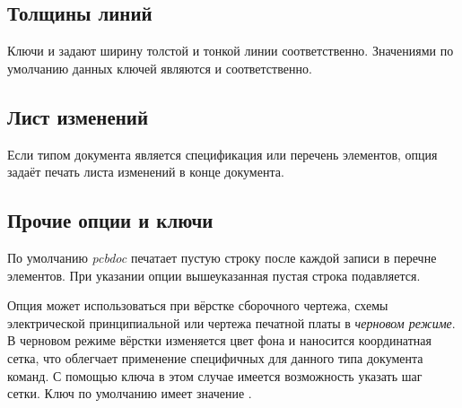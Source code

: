 \subsection{Толщины линий}

Ключи  и  задают ширину толстой и
тонкой линии соответственно. Значениями по умолчанию данных ключей являются
\bfsf{0.6mm} и \bfsf{0.3mm} соответственно.

\subsection{Лист изменений}

Если типом документа является спецификация или перечень элементов, опция
 задаёт печать листа изменений в конце документа.

\subsection{Прочие опции и ключи}

По умолчанию \emph{pcbdoc} печатает пустую строку после каждой записи в перечне
элементов. При указании опции  вышеуказанная пустая строка
подавляется.

Опция  может использоваться при вёрстке сборочного чертежа, схемы
электрической принципиальной или чертежа печатной платы в \emph{черновом режиме}. В
черновом режиме вёрстки изменяется цвет фона и наносится координатная сетка, что
облегчает применение специфичных для данного типа документа команд. С помощью ключа
 в этом случае имеется возможность указать шаг сетки. Ключ
 по умолчанию имеет значение \bfsf{10mm}.
